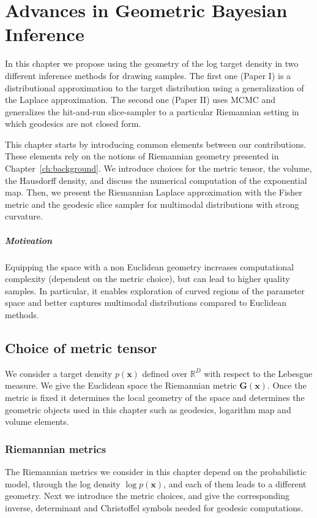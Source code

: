 \chapter{Advances in Geometric Bayesian Inference} \label{ch:mcmc}
In this chapter we propose using the geometry of the log target density in two different inference methods for drawing samples. The first one (Paper I) is a distributional approximation to the target distribution using a generalization of the Laplace approximation. The second one (Paper II) uses MCMC and generalizes the hit-and-run slice-sampler to a particular Riemannian setting in which geodesics are not closed form. 

This chapter starts by introducing common elements between our contributions. These elements rely on the notions of Riemannian geometry presented in Chapter~\ref{ch:background}.
We introduce choices for the metric tensor, the volume, the Hausdorff density, and discuss the numerical computation of the exponential map. Then, we present the Riemannian Laplace approximation with the Fisher metric and the geodesic slice sampler for multimodal distributions with strong curvature. 

\paragraph{Motivation}
Equipping the space with a non Euclidean geometry increases computational complexity (dependent on the metric choice), but can lead to higher quality samples. In particular, it enables exploration of curved regions of the parameter space and better captures multimodal distributions compared to Euclidean methods.

\section{Choice of metric tensor} \label{sec:geometric_tools}

We consider a target density $p(\boldsymbol{x})$ defined over $\mathbb{R}^D$ with respect to the Lebesgue measure. We give the Euclidean space the Riemannian metric $\mathbf{G}(\boldsymbol{x})$. Once the metric is fixed it determines the local geometry of the space and determines the geometric objects used in this chapter such as geodesics, logarithm map and volume elements.

\subsection{Riemannian metrics}
The Riemannian metrics we consider in this chapter depend on the probabilistic model, through the log density $\log p(\boldsymbol{x})$, and each of them leads to a different geometry. Next we introduce the metric choices,  and give the corresponding inverse, determinant and Christoffel symbols needed for geodesic computations.


